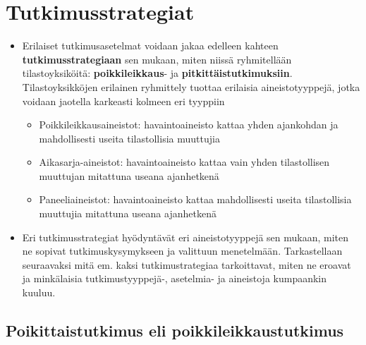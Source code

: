 \documentclass[
]{book}
\providecommand{\tightlist}{%
  \setlength{\itemsep}{0pt}\setlength{\parskip}{0pt}}
\begin{document}
\hypertarget{alaluku122}{%
\section{Tutkimusstrategiat}\label{alaluku122}}

\begin{itemize}
\tightlist
\item
  Erilaiset tutkimusasetelmat voidaan jakaa edelleen kahteen \textbf{tutkimusstrategiaan} sen mukaan, miten niissä ryhmitellään tilastoyksiköitä: \textbf{poikkileikkaus}- ja \textbf{pitkittäistutkimuksiin}. Tilastoyksikköjen erilainen ryhmittely tuottaa erilaisia aineistotyyppejä, jotka voidaan jaotella karkeasti kolmeen eri tyyppiin

  \begin{itemize}
  \tightlist
  \item
    Poikkileikkausaineistot: havaintoaineisto kattaa yhden ajankohdan ja mahdollisesti useita tilastollisia muuttujia
  \item
    Aikasarja-aineistot: havaintoaineisto kattaa vain yhden tilastollisen muuttujan mitattuna useana ajanhetkenä
  \item
    Paneeliaineistot: havaintoaineisto kattaa mahdollisesti useita tilastollisia muuttujia mitattuna useana ajanhetkenä
  \end{itemize}
\item
  Eri tutkimusstrategiat hyödyntävät eri aineistotyyppejä sen mukaan, miten ne sopivat tutkimuskysymykseen ja valittuun menetelmään. Tarkastellaan seuraavaksi mitä em. kaksi tutkimustrategiaa tarkoittavat, miten ne eroavat ja minkälaisia tutkimustyyppejä-, asetelmia- ja aineistoja kumpaankin kuuluu.
\end{itemize}

\hypertarget{poikittaistutkimus-eli-poikkileikkaustutkimus}{%
\subsection{\texorpdfstring{\textbf{Poikittaistutkimus} eli \textbf{poikkileikkaustutkimus}}{Poikittaistutkimus eli poikkileikkaustutkimus}}\label{poikittaistutkimus-eli-poikkileikkaustutkimus}}
\end{document}
